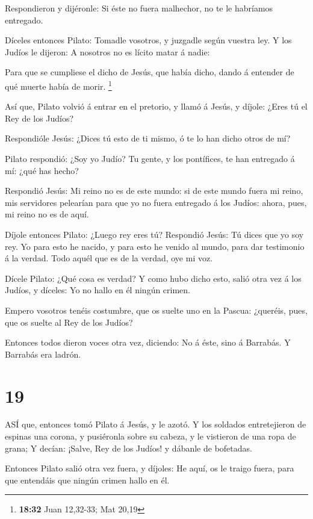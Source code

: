  Respondieron y dijéronle: Si éste no fuera malhechor, no
te le habríamos entregado.

 Díceles entonces Pilato: Tomadle vosotros, y juzgadle
según vuestra ley. Y los Judíos le dijeron: A nosotros no es lícito
matar á nadie:

 Para que se cumpliese el dicho de Jesús, que había dicho,
dando á entender de qué muerte había de morir. \footnote{\textbf{18:32}
  Juan 12,32-33; Mat 20,19}

 Así que, Pilato volvió á entrar en el pretorio, y llamó á
Jesús, y díjole: ¿Eres tú el Rey de los Judíos?

 Respondióle Jesús: ¿Dices tú esto de ti mismo, ó te lo han
dicho otros de mí?

 Pilato respondió: ¿Soy yo Judío? Tu gente, y los
pontífices, te han entregado á mí: ¿qué has hecho?

 Respondió Jesús: Mi reino no es de este mundo: si de este
mundo fuera mi reino, mis servidores pelearían para que yo no fuera
entregado á los Judíos: ahora, pues, mi reino no es de aquí.

 Díjole entonces Pilato: ¿Luego rey eres tú? Respondió
Jesús: Tú dices que yo soy rey. Yo para esto he nacido, y para esto he
venido al mundo, para dar testimonio á la verdad. Todo aquél que es de
la verdad, oye mi voz.

 Dícele Pilato: ¿Qué cosa es verdad? Y como hubo dicho
esto, salió otra vez á los Judíos, y díceles: Yo no hallo en él ningún
crimen.

 Empero vosotros tenéis costumbre, que os suelte uno en la
Pascua: ¿queréis, pues, que os suelte al Rey de los Judíos?

 Entonces todos dieron voces otra vez, diciendo: No á éste,
sino á Barrabás. Y Barrabás era ladrón.

\hypertarget{section-18}{%
\section{19}\label{section-18}}

 ASÍ que, entonces tomó Pilato á Jesús, y le azotó.
 Y los soldados entretejieron de espinas una corona, y
pusiéronla sobre su cabeza, y le vistieron de una ropa de grana;
 Y decían: ¡Salve, Rey de los Judíos! y dábanle de
bofetadas.

 Entonces Pilato salió otra vez fuera, y díjoles: He aquí,
os le traigo fuera, para que entendáis que ningún crimen hallo en él.

